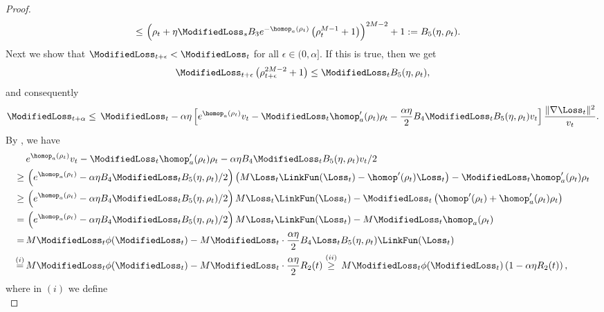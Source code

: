 \begin{proof}
\begin{align*}
        \le \, &  \left( \rho_t + \eta \ModifiedLoss_s B_3 e^{-\homop_a(\rho_t)} \left( \rho_t^{M-1} + 1 \right) \right)^{2M - 2} + 1 := B_5 (\eta, \rho_t).
    \end{align*}
    Next we show that $\ModifiedLoss_{t+\epsilon} < \ModifiedLoss_t$ for all $\epsilon \in (0, \alpha]$. If this is true, then we get
    \begin{equation*}
        \ModifiedLoss_{t+\epsilon} \left( \rho_{t+\epsilon}^{2M - 2} + 1 \right) \le \ModifiedLoss_t B_5 (\eta, \rho_t),
    \end{equation*}
    and consequently
    \begin{equation*}
        \ModifiedLoss_{t+\alpha} \le \, \ModifiedLoss_t - \alpha \eta \left[ e^{\homop_a(\rho_t)} v_t - \ModifiedLoss_t \homop_a^\prime (\rho_t) \rho_t - \frac{\alpha  \eta}{2}  B_4 \ModifiedLoss_t B_5 (\eta, \rho_t) v_t  \right] \frac{\|\nabla \Loss_t\|^2}{v_t}.
    \end{equation*}
    By , we have
    \begin{align*}
        & e^{\homop_a(\rho_t)} v_t - \ModifiedLoss_t \homop_a^\prime (\rho_t) \rho_t - \alpha  \eta  B_4 \ModifiedLoss_t B_5 (\eta, \rho_t) v_t /2 \\
        \ge \, & \left( e^{\homop_a(\rho_t)} - \alpha \eta B_4 \ModifiedLoss_t B_5 (\eta, \rho_t) /2 \right) \left( M \Loss_t \LinkFun(\Loss_t) -\homop'(\rho_t) \Loss_t \right) - \ModifiedLoss_t \homop_a^\prime (\rho_t) \rho_t \\
        \ge \, & \left( e^{\homop_a(\rho_t)} - \alpha \eta B_4 \ModifiedLoss_t B_5 (\eta, \rho_t) /2 \right) M \Loss_t \LinkFun(\Loss_t) - \ModifiedLoss_t \left( \homop'(\rho_t) + \homop_a^\prime (\rho_t) \rho_t \right) \\
        = \, & \left( e^{\homop_a(\rho_t)} - \alpha \eta B_4 \ModifiedLoss_t B_5 (\eta, \rho_t) /2 \right) M \Loss_t \LinkFun(\Loss_t) - M \ModifiedLoss_t \homop_a (\rho_t) \\
        = \, & M \ModifiedLoss_t \phi (\ModifiedLoss_t) - M \ModifiedLoss_t \cdot \frac{\alpha \eta}{2} B_4 \Loss_t B_5 (\eta, \rho_t) \LinkFun(\Loss_t) \\
        \stackrel{(i)}{=} \, & M \ModifiedLoss_t \phi (\ModifiedLoss_t) - M \ModifiedLoss_t \cdot \frac{\alpha \eta}{2} R_2 (t) \stackrel{(ii)}{\ge} \, M \ModifiedLoss_t \phi (\ModifiedLoss_t) \left( 1- \alpha \eta R_2 (t) \right),
    \end{align*}
    where in $(i)$ we define
    \begin{equation*}

\end{equation*}
\end{proof}
